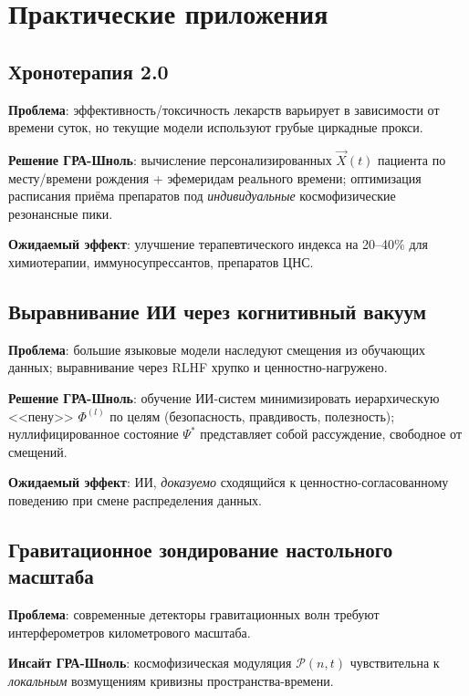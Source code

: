 \documentclass[12pt,a4paper]{article}
\theoremstyle{plain}
\theoremstyle{definition}
\theoremstyle{remark}
\newcommand{\vX}{\vec{X}}
\begin{document}
\section{Практические приложения}
\label{sec:applications}

\subsection{Хронотерапия 2.0}
\textbf{Проблема}: эффективность/токсичность лекарств варьирует в зависимости от времени суток, но текущие модели используют грубые циркадные прокси.

\textbf{Решение ГРА-Шноль}: вычисление персонализированных $\vX(t)$ пациента по месту/времени рождения + эфемеридам реального времени; оптимизация расписания приёма препаратов под \emph{индивидуальные} космофизические резонансные пики.

\textbf{Ожидаемый эффект}: улучшение терапевтического индекса на 20--40\% для химиотерапии, иммуносупрессантов, препаратов ЦНС.

\subsection{Выравнивание ИИ через когнитивный вакуум}
\textbf{Проблема}: большие языковые модели наследуют смещения из обучающих данных; выравнивание через RLHF хрупко и ценностно-нагружено.

\textbf{Решение ГРА-Шноль}: обучение ИИ-систем минимизировать иерархическую <<пену>> $\Phi^{(l)}$ по целям (безопасность, правдивость, полезность); нуллифицированное состояние $\Psi^*$ представляет собой рассуждение, свободное от смещений.

\textbf{Ожидаемый эффект}: ИИ, \emph{доказуемо} сходящийся к ценностно-согласованному поведению при смене распределения данных.

\subsection{Гравитационное зондирование настольного масштаба}
\textbf{Проблема}: современные детекторы гравитационных волн требуют интерферометров километрового масштаба.

\textbf{Инсайт ГРА-Шноль}: космофизическая модуляция $\mathcal{P}(n,t)$ чувствительна к \emph{локальным} возмущениям кривизны пространства-времени.
\end{document}
